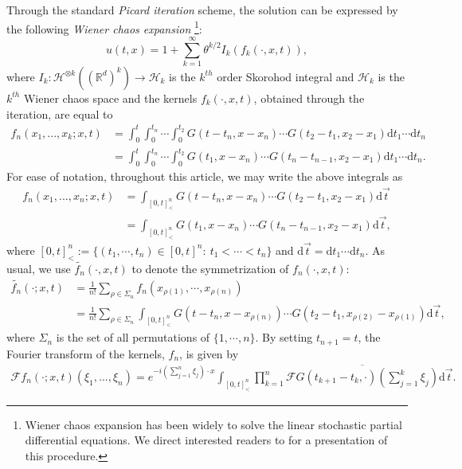 \documentclass[12pt]{report}
\theoremstyle{plain}
\theoremstyle{definition}
\numberwithin{equation}{section}
\newcommand{\R}{\mathbb{R}}
\newcommand{\ud}{\ensuremath{ \mathrm{d} }}
\begin{document}
Through the standard {\it Picard iteration} scheme, the solution can be expressed by the following
{\it Wiener chaos expansion} \footnote{Wiener chaos expansion has been widely to solve the linear
	stochastic partial differential equations. We direct interested readers to \cite[Section
	5]{balan.song:17:wavespacetimecolor} for a presentation of this procedure.}:
\begin{equation} \label{E:solwexp}
u(t,x) = 1 + \sum_{k=1}^\infty \theta^{k/2}I_k(f_k(\cdot,x,t)),
\end{equation}
where $I_k : \mathcal{H}^{\otimes k}\left((\R^d)^k\right) \to \mathcal{H}_k$ is the $k^{th}$ order
Skorohod integral and $\mathcal{H}_k$ is the $k^{th}$ Wiener chaos space and the kernels
$f_k(\cdot,x,t)$, obtained through the iteration, are equal to
\begin{align*}
f_n(x_1,...,x_k;x,t)
& = \int_0^t \int_0^{t_n}\cdots \int_0^{t_2} G(t-t_n,x-x_n)\cdots G(t_2-t_1,x_2-x_1) \ud t_1\cdots \ud t_n \\
& = \int_0^t \int_0^{t_n}\cdots \int_0^{t_2} G(t_1,x-x_n)\cdots G(t_n-t_{n-1},x_2-x_1) \ud t_1\cdots \ud t_n. \nonumber
\end{align*}
For ease of notation, throughout this article, we may write the above integrals as
\begin{align*}
f_n(x_1,...,x_n;x,t)
& = \int_{[0,t]^n_<} G(t-t_n,x-x_n)\cdots G(t_2-t_1,x_2-x_1) \ud \vec{t} \\
& = \int_{[0,t]^n_<}G(t_1,x-x_n)\cdots G(t_n-t_{n-1},x_2-x_1) \ud \vec{t},
\end{align*}
where $[0,t]_<^n:=\{(t_1,\cdots,t_n)\in [0,t]^n:\: t_1<\cdots < t_n\}$ and $\ud \vec{t} = \ud t_1 \cdots \ud t_n$. As usual, we use
$\widetilde{f_n}(\cdot, x, t)$ to denote the symmetrization of $f_n(\cdot,x,t)$:
\begin{align*}
\widetilde{f_n}(\cdot; x, t)
& = \frac{1}{n!} \sum_{\rho \in \Sigma_n} f_n\left(x_{\rho(1)},\cdots, x_{\rho(n)}\right) \\
& = \frac{1}{n!} \sum_{\rho \in \Sigma_n} \int_{[0,t]^n_<} G\left(t-t_n,x-x_{\rho(n)}\right)\cdots G\left(t_2-t_1,x_{\rho(2)}-x_{\rho(1)}\right) \ud \vec{t},
\end{align*}
where $\Sigma_n$ is the set of all permutations of $\{1,\cdots,n\} $.
By setting $t_{n+1}=t$, the Fourier transform of the kernels, $f_n$, is given by
\begin{align} \label{E:fweker}
\mathcal{F}f_n(\cdot;x,t)(\xi_1,...,\xi_n)
= e^{-i \left(\sum_{j=1}^n \xi_j \right) \cdot x} \int_{[0,t]^n_<}
\prod_{k=1}^n \overline{\mathcal{F}G(t_{k+1}-t_k,\cdot)\left(\sum_{j=1}^k \xi_j\right) } \ud \vec{t}.
\end{align}
\end{document}

